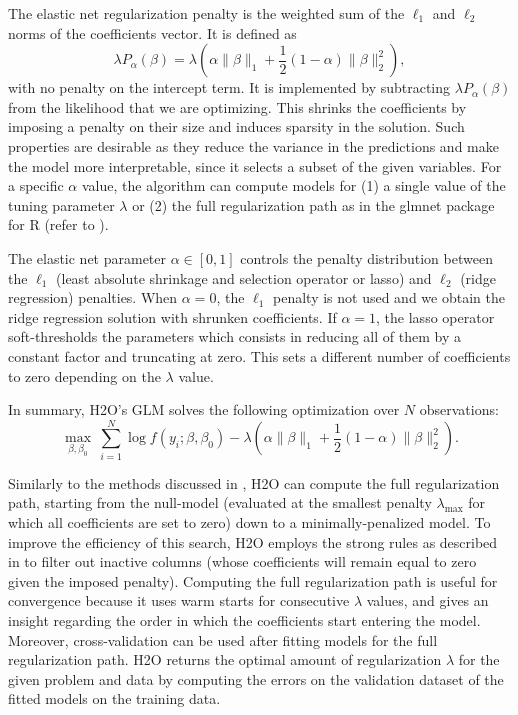The elastic net regularization penalty is the weighted sum of the $\ell_1$ and $\ell_2$ norms of the coefficients vector. It is defined as $$\lambda P_{\alpha}(\beta) = \lambda \left(\alpha \| \beta \|_1 + \frac{1}{2} (1- \alpha) \| \beta \|_2^2 \right),$$ with no penalty on the intercept term. It is implemented by subtracting $\lambda P_{\alpha}(\beta)$ from the likelihood that we are optimizing. This shrinks the coefficients by imposing a penalty on their size and induces sparsity in the solution. Such properties are desirable as they reduce the variance in the predictions and make the model more interpretable, since it selects a subset of the given variables. For a specific $\alpha$ value, the algorithm can compute models for (1) a single value of the tuning parameter $\lambda$ or (2) the full regularization path as in the glmnet package for R (refer to ).

The elastic net parameter $\alpha \in [0,1]$ controls the penalty distribution between the $\ell_1$ (least absolute shrinkage and selection operator or lasso) and $\ell_2$ (ridge regression)
penalties. When $\alpha=0$, the $\ell_1$ penalty is not used and we obtain the
ridge regression solution with shrunken coefficients. If $\alpha=1$, the lasso operator soft-thresholds the parameters which consists in reducing all of them by a constant factor and truncating at zero. This sets a different number of coefficients to zero depending on the $\lambda$ value.
 
 In summary, H2O's GLM  solves the following optimization over $N$ observations:
$$ \max_{\beta,\beta_0}  \  \sum_{i=1}^N \log f\left(y_i ; \beta,\beta_0\right)  - \lambda \left(\alpha \| \beta \|_1 +  \frac{1}{2} (1- \alpha)\| \beta \|_2^2 \right). $$




Similarly to the methods discussed in , H2O can compute the full regularization path, starting
from the null-model (evaluated at the smallest penalty $\lambda_{\max}$ for which all coefficients are set to zero) down to a minimally-penalized model. To improve the efficiency of this search, 
H2O employs the strong rules as described in  to filter out inactive columns (whose coefficients will remain equal to zero given the imposed penalty). Computing the full regularization path is useful for convergence because it uses warm starts for consecutive $\lambda$ values, and gives an insight regarding the order in which the coefficients start entering the model. Moreover, cross-validation can be used after fitting models for the full regularization path. H2O returns the optimal amount of regularization $\lambda$ for the given problem and data by computing the errors on the validation dataset of the fitted models on the training data.

